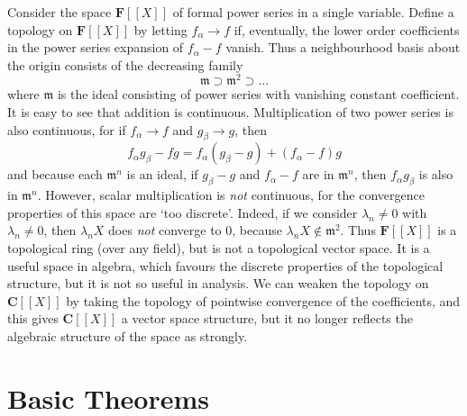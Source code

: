 \begin{example}
    Consider the space $\mathbf{F}[[X]]$ of formal power series in a single variable. Define a topology on $\mathbf{F}[[X]]$ by letting $f_\alpha \to f$ if, eventually, the lower order coefficients in the power series expansion of $f_\alpha - f$ vanish. Thus a neighbourhood basis about the origin consists of the decreasing family
    \[ \mathfrak{m} \supset \mathfrak{m}^2 \supset \dots \]
    where $\mathfrak{m}$ is the ideal consisting of power series with vanishing constant coefficient. It is easy to see that addition is continuous. Multiplication of two power series is also continuous, for if $f_\alpha \to f$ and $g_\beta \to g$, then
    \[ f_\alpha g_\beta - fg = f_\alpha (g_\beta - g) + (f_\alpha - f) g \]
    and because each $\mathfrak{m}^n$ is an ideal, if $g_\beta - g$ and $f_\alpha - f$ are in $\mathfrak{m}^n$, then $f_\alpha g_\beta$ is also in $\mathfrak{m}^n$. However, scalar multiplication is {\it not} continuous, for the convergence properties of this space are `too discrete'. Indeed, if we consider $\lambda_n \neq 0$ with $\lambda_n \neq 0$, then $\lambda_n X$ does {\it not} converge to 0, because $\lambda_n X \not \in \mathfrak{m}^2$. Thus $\mathbf{F}[[X]]$ is a topological ring (over any field), but is not a topological vector space. It is a useful space in algebra, which favours the discrete properties of the topological structure, but it is not so useful in analysis. We can weaken the topology on $\mathbf{C}[[X]]$ by taking the topology of pointwise convergence of the coefficients, and this gives $\mathbf{C}[[X]]$ a vector space structure, but it no longer reflects the algebraic structure of the space as strongly.
\end{example}

\section{Basic Theorems}

